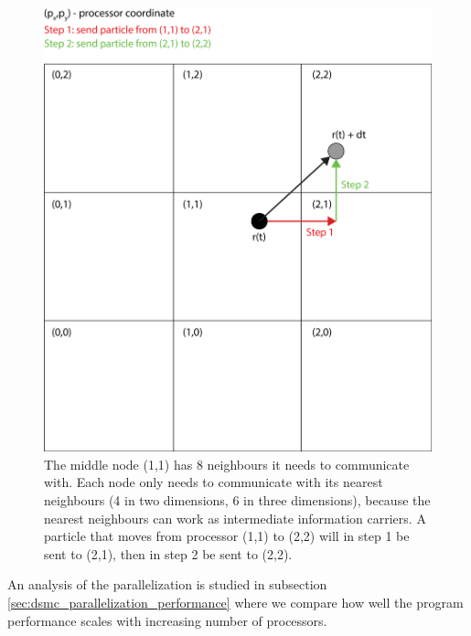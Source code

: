 \begin{figure}[h]
\begin{center}
\includegraphics[width=\textwidth, trim=0cm 0cm 0cm 0cm, clip]{DSMC/figures/parallelization_facet_technique.eps}
\end{center}
\caption{The middle node (1,1) has 8 neighbours it needs to communicate with. Each node only needs to communicate with its nearest neighbours (4 in two dimensions, 6 in three dimensions), because the nearest neighbours can work as intermediate information carriers. A particle that moves from processor (1,1) to (2,2) will in step 1 be sent to (2,1), then in step 2 be sent to (2,2).}
\label{fig:parallelization_facet_technique}
\end{figure}
An analysis of the parallelization is studied in subsection \ref{sec:dsmc_parallelization_performance} where we compare how well the program performance scales with increasing number of processors. 